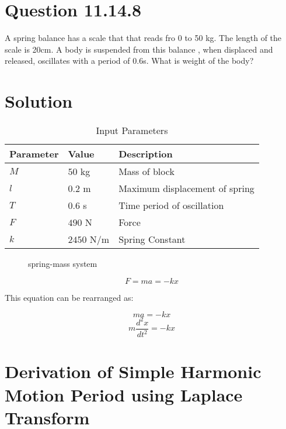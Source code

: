 \documentclass[journal,12pt,twocolumn]{IEEEtran}
\theoremstyle{remark}
\begin{document}
\section{Question 11.14.8}A spring balance has a scale that that reads fro 0 to 50 kg. The length of the scale is 20cm. A body is suspended from this balance , when displaced and released, oscillates with a period of 0.6s. What is weight of the body? 

\section{Solution}
\begin{table}[htbp]
    \centering
    \caption{Input Parameters}
    \label{tab:parameters}
	\begin{tabular}{|p{1.2cm}|p{1cm}|p{4cm}|}
        \hline
        \textbf{Parameter} & \textbf{Value} & \textbf{Description} \\
        \hline
        $M$ & $50$ kg & Mass of block \\
        \hline
        $l$ & $0.2$ m & Maximum displacement of spring \\
        \hline
	$T$ & $0.6$ s & Time period of oscillation \\
        \hline
	$F$ & $490$ N & Force \\
        \hline
	$k$ & $2450$ N/m & Spring Constant \\
        \hline
    \end{tabular}
\end{table}

\begin{figure}[!h]
    \centering
        \resizebox{0.6\columnwidth}{!}{%
        }
    \caption{ spring-mass system}
    \label{fig:another-spring-mass-system}
\end{figure}

\begin{equation} 
	F = ma = -kx
\end{equation}

This equation can be rearranged as:

\begin{equation}
	ma = -kx 
\end{equation}
\begin{equation}
	m\frac{d^2x}{dt^2} = -kx 
\end{equation}


\section{Derivation of Simple Harmonic Motion Period using Laplace Transform}
\end{document}
